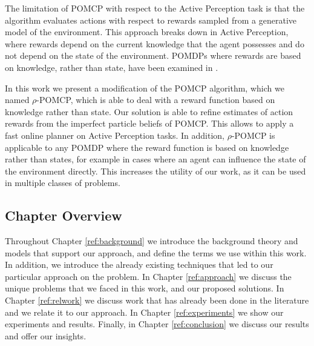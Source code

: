The limitation of POMCP with respect to the Active Perception task is that the algorithm evaluates
actions with respect to rewards sampled from a generative model of the environment. This approach
breaks down in Active Perception, where rewards depend on the current knowledge that the agent
possesses and do not depend on the state of the environment. POMDPs where rewards are based on
knowledge, rather than state, have been examined in \cite{cit:rpomdp}.


In this work we present a modification of the POMCP algorithm, which we named $\rho$-POMCP, which is
able to deal with a reward function based on knowledge rather than state. Our solution is able to
refine estimates of action rewards from the imperfect particle beliefs of POMCP. This allows to
apply a fast online planner on Active Perception tasks. In addition, $\rho$-POMCP is applicable to
any POMDP where the reward function is based on knowledge rather than states, for example in cases
where an agent can influence the state of the environment directly. This increases the utility of
our work, as it can be used in multiple classes of problems.


\subsection{Chapter Overview}


Throughout Chapter \ref{ref:background} we introduce the background theory and models that support
our approach, and define the terms we use within this work. In addition, we introduce the already
existing techniques that led to our particular approach on the problem. In Chapter
\ref{ref:approach} we discuss the unique problems that we faced in this work, and our proposed
solutions. In Chapter \ref{ref:relwork} we discuss work that has already been done in the literature
and we relate it to our approach. In Chapter \ref{ref:experiments} we show our experiments and
results. Finally, in Chapter \ref{ref:conclusion} we discuss our results and offer our insights.

